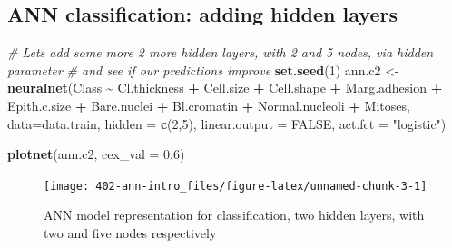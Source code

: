 \documentclass[
]{book}
\newenvironment{Shaded}{\begin{snugshade}}{\end{snugshade}}
\newcommand{\CommentTok}[1]{\textcolor[rgb]{0.56,0.35,0.01}{\textit{#1}}}
\newcommand{\DataTypeTok}[1]{\textcolor[rgb]{0.13,0.29,0.53}{#1}}
\newcommand{\DecValTok}[1]{\textcolor[rgb]{0.00,0.00,0.81}{#1}}
\newcommand{\FloatTok}[1]{\textcolor[rgb]{0.00,0.00,0.81}{#1}}
\newcommand{\KeywordTok}[1]{\textcolor[rgb]{0.13,0.29,0.53}{\textbf{#1}}}
\newcommand{\NormalTok}[1]{#1}
\newcommand{\OperatorTok}[1]{\textcolor[rgb]{0.81,0.36,0.00}{\textbf{#1}}}
\newcommand{\OtherTok}[1]{\textcolor[rgb]{0.56,0.35,0.01}{#1}}
\newcommand{\StringTok}[1]{\textcolor[rgb]{0.31,0.60,0.02}{#1}}
\theoremstyle{definition}
\theoremstyle{definition}
\theoremstyle{definition}
\theoremstyle{remark}
\begin{document}
\hypertarget{ann-classification-adding-hidden-layers}{%
\subsection{ANN classification: adding hidden layers}\label{ann-classification-adding-hidden-layers}}

\begin{Shaded}
\begin{Highlighting}[]
\CommentTok{\# Lets add some more 2 more hidden layers, with 2 and 5 nodes, via hidden parameter}
\CommentTok{\# and see if our predictions improve}
\KeywordTok{set.seed}\NormalTok{(}\DecValTok{1}\NormalTok{)}
\NormalTok{ann.c2 \textless{}{-}}\StringTok{ }\KeywordTok{neuralnet}\NormalTok{(Class }\OperatorTok{\textasciitilde{}}\StringTok{ }\NormalTok{Cl.thickness }\OperatorTok{+}\StringTok{ }\NormalTok{Cell.size }\OperatorTok{+}\StringTok{  }\NormalTok{Cell.shape }\OperatorTok{+}\StringTok{ }
\StringTok{                        }\NormalTok{Marg.adhesion }\OperatorTok{+}\StringTok{ }\NormalTok{Epith.c.size }\OperatorTok{+}\StringTok{ }\NormalTok{Bare.nuclei }\OperatorTok{+}\StringTok{ }
\StringTok{                        }\NormalTok{Bl.cromatin }\OperatorTok{+}\StringTok{ }\NormalTok{Normal.nucleoli }\OperatorTok{+}\StringTok{ }\NormalTok{Mitoses, }
                        \DataTypeTok{data=}\NormalTok{data.train, }
                        \DataTypeTok{hidden =} \KeywordTok{c}\NormalTok{(}\DecValTok{2}\NormalTok{,}\DecValTok{5}\NormalTok{),}
                        \DataTypeTok{linear.output =} \OtherTok{FALSE}\NormalTok{, }
                        \DataTypeTok{act.fct =} \StringTok{"logistic"}\NormalTok{)}

\KeywordTok{plotnet}\NormalTok{(ann.c2, }\DataTypeTok{cex\_val =} \FloatTok{0.6}\NormalTok{)}
\end{Highlighting}
\end{Shaded}

\begin{figure}

{\centering \texttt{[image: 402-ann-intro\_files/figure-latex/unnamed-chunk-3-1]} 

}

\caption{ANN model representation for classification, two hidden layers, with two and five nodes respectively}\label{fig:unnamed-chunk-3}
\end{figure}
\end{document}
